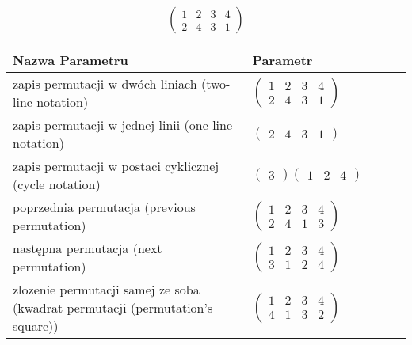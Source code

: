 \documentclass[12pt]{article}
\begin{document}
\subsection{}
\begin{center}
\[
\begin{pmatrix}
	1 & 2 & 3 & 4 \\ 
	2 & 4 & 3 & 1 
\end{pmatrix}
\]

\begin{tabular}{|m{0.6\linewidth}|m{0.4\linewidth}|}
	\hline
	Nazwa Parametru & Parametr \\
	\hline
	zapis permutacji w dwóch liniach (two-line notation) & $\begin{pmatrix} 1 & 2 & 3 & 4 \\ 
2 & 4 & 3 & 1 \end{pmatrix}$ \\ 
	\hline
	zapis permutacji w jednej linii (one-line notation) & $\begin{pmatrix} 2 & 4 & 3 & 1 \end{pmatrix}$ \\ 
	\hline
	zapis permutacji w postaci cyklicznej (cycle notation) & $\begin{pmatrix} 3 \end{pmatrix} \begin{pmatrix} 1 & 2 & 4 \end{pmatrix} $ \\ 
	\hline
	poprzednia permutacja (previous permutation) & $\begin{pmatrix} 1 & 2 & 3 & 4 \\ 
2 & 4 & 1 & 3 \end{pmatrix}$ \\ 
	\hline
	następna permutacja (next permutation) & $\begin{pmatrix} 1 & 2 & 3 & 4 \\ 
3 & 1 & 2 & 4 \end{pmatrix}$ \\ 
	\hline
	zlozenie permutacji samej ze soba (kwadrat permutacji (permutation's square)) & $\begin{pmatrix} 1 & 2 & 3 & 4 \\ 
4 & 1 & 3 & 2 \end{pmatrix}$ \\ 
	\hline
\end{tabular}
\end{center}
\end{document}

